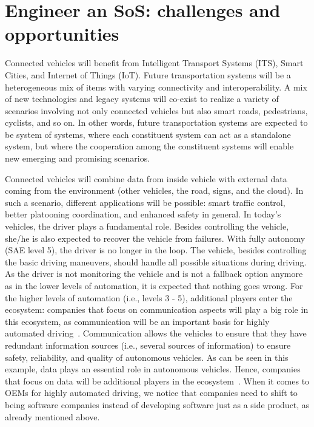 \section{Engineer an SoS: challenges and opportunities}

Connected vehicles will benefit from Intelligent Transport Systems (ITS), Smart
Cities, and Internet of Things (IoT). 
Future transportation systems will be a heterogeneous mix of items with varying connectivity and interoperability. A mix of new technologies and legacy systems will co-exist to realize a variety of scenarios involving not only connected vehicles but also smart roads, pedestrians, cyclists, and so on. In other words, future transportation systems are expected to be system of systems, where each constituent system can act as a standalone system, but where the cooperation among the constituent systems will enable new emerging and promising scenarios. 


Connected vehicles  will combine data from inside vehicle
with external data coming from the environment (other vehicles, the road, signs,
and the cloud). In such a scenario, different applications will be possible: smart
traffic control, better platooning coordination, and enhanced safety in general.
In today's vehicles, the driver plays a fundamental role. Besides controlling
the vehicle, she/he is also expected to recover the vehicle from failures. With fully
autonomy (SAE level 5), the driver is no longer in the loop. The vehicle, besides
controlling the basic driving maneuvers, should handle all possible situations during
driving. As the driver is not monitoring the vehicle and is not a fallback option
anymore as in the lower levels of automation, it is expected that nothing goes wrong.
For the higher levels of automation (i.e., levels 3 - 5), additional players enter the
ecosystem: companies that focus on communication aspects will play a big role in
this ecosystem, as communication will be an important basis for highly automated
driving~\cite{Knauss2017challenges}. Communication allows the vehicles to ensure that they have redundant
information sources (i.e., several sources of information) to ensure safety, reliability,
and quality of autonomous vehicles. As can be seen in this example, data plays an
essential role in autonomous vehicles. Hence, companies that focus on data will be
additional players in the ecosystem~\cite{Knauss2017challenges}. When it comes to OEMs for highly automated
driving, we notice that companies need to shift to being software companies
instead of developing software just as a side product, as already mentioned above.



